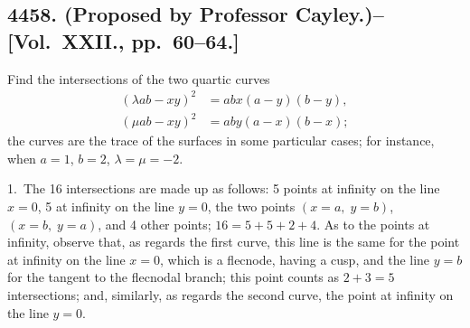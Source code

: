 \documentclass[11pt,a4paper]{book}
\begin{document}
\newpage

\subsection*{4458. (Proposed by Professor Cayley.)\---[Vol.~XXII., pp.~60--64.]}

Find the intersections of the two quartic curves
\begin{align}
\label{eq:4458-1}
(\lambda ab - xy)^2 &= abx(a-y)(b-y), \\
\label{eq:4458-2}
(\mu ab - xy)^2 &= aby(a-x)(b-x);
\end{align}
the curves are the trace of the surfaces in some particular cases; for instance, when $a=1$, $b=2$, $\lambda=\mu=-2$.

\begin{solution}
1.~The 16 intersections are made up as follows: 5 points at infinity on the line $x=0$, 5 at infinity on the line $y=0$, the two points $(x=a,\; y=b)$, $(x=b,\; y=a)$, and 4 other points; $16 = 5+5+2+4$. As to the points at infinity, observe that, as regards the first curve, this line is the same for the point at infinity on the line $x=0$, which is a flecnode, having a cusp, and the line $y=b$ for the tangent to the flecnodal branch; this point counts as $2+3=5$ intersections; and, similarly, as regards the second curve, the point at infinity on the line $y=0$.


\end{solution}
\end{document}
